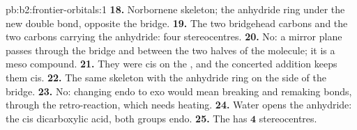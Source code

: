 \begin{solution}{pb:b2:frontier-orbitals:1}
\textbf{18.} Norbornene skeleton; the anhydride ring under the new double bond, opposite the
 bridge.
\textbf{19.} The two bridgehead carbons and the two carbons carrying the anhydride: four
stereocentres.
\textbf{20.} No: a mirror plane passes through the  bridge and between the two halves
of the molecule; it is a meso compound.
\textbf{21.} They were cis on the , and the concerted addition keeps them cis.
\textbf{22.} The same skeleton with the anhydride ring on the side of the  bridge.
\textbf{23.} No: changing endo to exo would mean breaking and remaking  bonds, through
the retro-reaction, which needs heating.
\textbf{24.} Water opens the anhydride: the cis dicarboxylic acid, both  groups endo.
\textbf{25.} The  has $\boldsymbol{4}$ stereocentres.
\end{solution}
